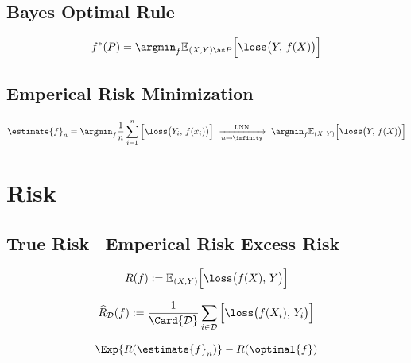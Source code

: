 \documentclass[18pt,a3paper,landscape, ncols=3]{cheatsheet}
\begin{document}
	\subsection{Bayes Optimal Rule}
		\begin{mdframed}
			\[
				f^{*}(P) = \argmin_{f} \mathbb{E}_{(X,Y) \as P} \Big[\loss \big(Y,\, f(X)\big)\Big]
			\]
		\end{mdframed}
	\subsection{Emperical Risk Minimization}
		\begin{mdframed}
			\[
				 \estimate{f}_{n} = \argmin_{f} \frac{1}{n} \sum_{i=1}^{n} \Big[\loss \big(Y_i,\, f(x_i)\big)\Big]\ \xrightarrow[n \rightarrow \infinity]{\quad\text{  LNN  }\quad}\ \argmin_{f} \mathbb{E}_{(X,\,Y)} \Big[\loss \big(Y,\, f(X)\big)\Big]
			\]
		\end{mdframed}

\columnbreak

\section{Risk} \seperator
	\subsection{True Risk \qquad\qquad\qquad\qquad\ Emperical Risk \qquad\qquad\quad Excess Risk}
		\begin{mdframed}
			\begin{minipage}{0.3\linewidth}
				\[
					R(f) := \mathbb{E}_{(X,Y)} \Big[\loss \big(f(X),\, Y\big)\Big]
				\]
			\end{minipage}%
			\hfill\vrule\hfill%
			\begin{minipage}{0.35\linewidth}
				\[
					\widehat{R}_{\mathcal{D}}(f) := \frac{1}{\Card{\mathcal{D}}} \sum_{i \in \mathcal{D}} \Big[\loss \big(f(X_i),\, Y_i\big)\Big]
				\]
			\end{minipage}%
			\hfill\vrule\hfill%
			\begin{minipage}{0.25\linewidth}
				\[
					\Exp{R(\estimate{f}_{n})} - R(\optimal{f})
				\]
			\end{minipage}
		\end{mdframed}
\end{document}
